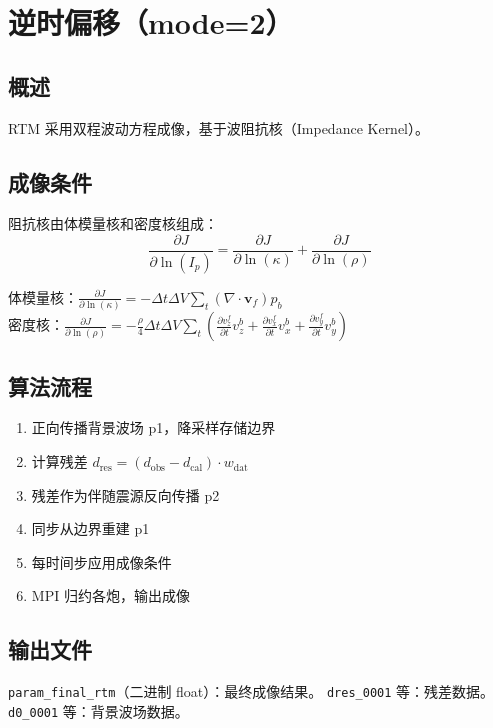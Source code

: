 \documentclass[11pt,a4paper]{ctexart}
\begin{document}
\section{逆时偏移（mode=2）}

\subsection{概述}

RTM 采用双程波动方程成像，基于波阻抗核（Impedance Kernel）。

\subsection{成像条件}

阻抗核由体模量核和密度核组成：
\[
\frac{\partial J}{\partial \ln(I_p)} =
\frac{\partial J}{\partial \ln(\kappa)} +
\frac{\partial J}{\partial \ln(\rho)}
\]

体模量核：$\frac{\partial J}{\partial \ln(\kappa)} = -\Delta t \Delta V \sum_t (\nabla \cdot \mathbf{v}_f) p_b$ \\
密度核：$\frac{\partial J}{\partial \ln(\rho)} = -\frac{\rho}{4} \Delta t \Delta V \sum_t
(\frac{\partial v_z^f}{\partial t} v_z^b + \frac{\partial v_x^f}{\partial t} v_x^b + \frac{\partial v_y^f}{\partial t} v_y^b)$

\subsection{算法流程}

\begin{enumerate}
  \item 正向传播背景波场 p1，降采样存储边界
  \item 计算残差 $d_{\text{res}} = (d_{\text{obs}} - d_{\text{cal}}) \cdot w_{\text{dat}}$
  \item 残差作为伴随震源反向传播 p2
  \item 同步从边界重建 p1
  \item 每时间步应用成像条件
  \item MPI 归约各炮，输出成像
\end{enumerate}

\subsection{输出文件}

\texttt{param\_final\_rtm}（二进制 float）：最终成像结果。
\texttt{dres\_0001} 等：残差数据。\texttt{d0\_0001} 等：背景波场数据。
\end{document}
